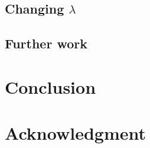 \subsection{Changing $\lambda$}
\label{subsec:lambda}

\subsection{Further work}
\label{subsec:further_work}


\section{Conclusion}


\section*{Acknowledgment}




